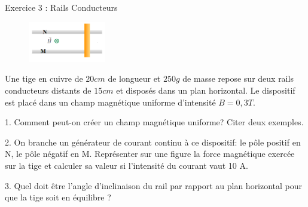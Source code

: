 \documentclass[12pt, french]{article}
\begin{document}
\begin{Box2}{Exercice 3 : Rails Conducteurs}
\begin{figure}
  \begin{center}
     \vspace{-0.5cm}
    \includegraphics[width=0.3\textwidth]{./img/Rails_00.png}
  \end{center}
\end{figure}
Une tige en cuivre de $20 cm$ de longueur et $250 g$ de masse repose sur deux rails conducteurs distants de $15cm$ et disposés dans un plan horizontal. Le dispositif est placé dans un champ magnétique uniforme
d'intensité $B = 0,3 T$.

1. Comment peut-on créer un champ magnétique uniforme? Citer deux exemples.

2. On branche un générateur de courant continu à ce dispositif: le pôle positif en
N, le pôle négatif en M. Représenter sur une figure la force magnétique exercée sur la tige et calculer sa
valeur si l’intensité du courant vaut 10 A.

3. Quel doit être l’angle d’inclinaison du rail par rapport au plan horizontal pour que la tige soit en équilibre ?

\end{Box2}
\end{document}
